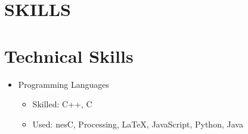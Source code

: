 \documentclass[margin]{res}
\begin{document}
\begin{resume}
\section{SKILLS} 
\normalsize{\section{Technical Skills}}
                 \begin{itemize}
                 \item[] Programming Languages 
                 	\begin{itemize}
                 	\item Skilled: C++, C
                 	\item Used: nesC, Processing, \LaTeX, JavaScript, Python, Java
                 	
                 	\end{itemize}
                 \end{itemize}

                  

\end{resume}
\end{document}
